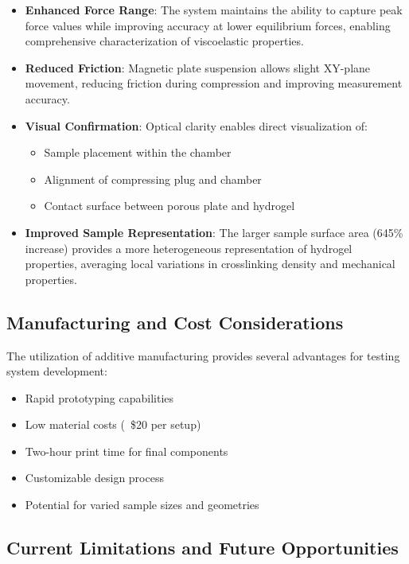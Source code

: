 \begin{itemize}
    \item \textbf{Enhanced Force Range}: The system maintains the ability to capture peak force values while improving accuracy at lower equilibrium forces, enabling comprehensive characterization of viscoelastic properties.
    
    \item \textbf{Reduced Friction}: Magnetic plate suspension allows slight XY-plane movement, reducing friction during compression and improving measurement accuracy.
    
    \item \textbf{Visual Confirmation}: Optical clarity enables direct visualization of:
    \begin{itemize}
        \item Sample placement within the chamber
        \item Alignment of compressing plug and chamber
        \item Contact surface between porous plate and hydrogel
    \end{itemize}
    
    \item \textbf{Improved Sample Representation}: The larger sample surface area (645\% increase) provides a more heterogeneous representation of hydrogel properties, averaging local variations in crosslinking density and mechanical properties.
\end{itemize}

\subsection{Manufacturing and Cost Considerations}
The utilization of additive manufacturing provides several advantages for testing system development:
\begin{itemize}
    \item Rapid prototyping capabilities
    \item Low material costs (~\$20 per setup)
    \item Two-hour print time for final components
    \item Customizable design process
    \item Potential for varied sample sizes and geometries
\end{itemize}

\subsection{Current Limitations and Future Opportunities}

